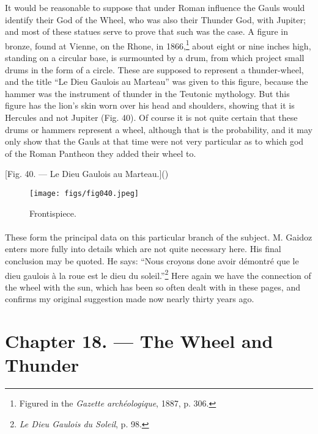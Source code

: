 \documentclass[a4paper, 11pt, oneside, polutonikogreek, english]{article}
\begin{document}
It would be reasonable to suppose that under Roman influence the Gauls would identify their God of the Wheel, who was also their Thunder God, with Jupiter; and most of these statues serve to prove that such was the case. A figure in bronze, found at Vienne, on the Rhone, in 1866,\footnote{Figured in the \emph{Gazette archéologique}, 1887, p. 306.} about eight or nine inches high, standing on a circular base, is surmounted by a drum, from which project small drums in the form of a circle. These are supposed to represent a thunder-wheel, and the title ``Le Dieu Gaulois au Marteau'' was given to this figure, because the hammer was the instrument of thunder in the Teutonic mythology. But this figure has the lion's skin worn over his head and shoulders, showing that it is Hercules and not Jupiter (Fig. 40). Of course it is not quite certain that these drums or hammers represent a wheel, although that is the probability, and it may only show that the Gauls at that time were not very particular as to which god of the Roman Pantheon they added their wheel to.

[Fig. 40. --- Le Dieu Gaulois au Marteau.]()
\begin{figure}[H]
\centering
\texttt{[image: figs/fig040.jpeg]}
\caption{Frontispiece.}
\end{figure}
\paragraph{}
These form the principal data on this particular branch of the subject. M. Gaidoz enters more fully into details which are not quite necessary here. His final conclusion may be quoted. He says: ``Nous croyons done avoir démontré que le dieu gaulois à la roue est le dieu du soleil.''\footnote{\emph{Le Dieu Gaulois du Soleil}, p. 98.} Here again we have the connection of the wheel with the sun, which has been so often dealt with in these pages, and confirms my original suggestion made now nearly thirty years ago.
\clearpage
\section{Chapter 18. --- The Wheel and Thunder}
\end{document}
